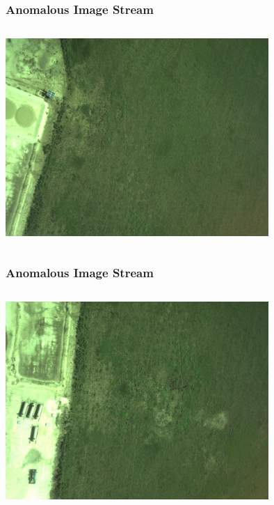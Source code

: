 \documentclass{beamer}
\begin{document}
\begin{frame}
\frametitle{Anomalous Image Stream}
\begin{columns}
\begin{centering}
\includegraphics[width = 10cm]{Figures/bad4}
\end{centering}
\end{columns}
\end{frame}


\begin{frame}
\frametitle{Anomalous Image Stream}
\begin{columns}
\begin{centering}
\includegraphics[width = 10cm]{Figures/bad5}
\end{centering}
\end{columns}
\end{frame}
\end{document}
